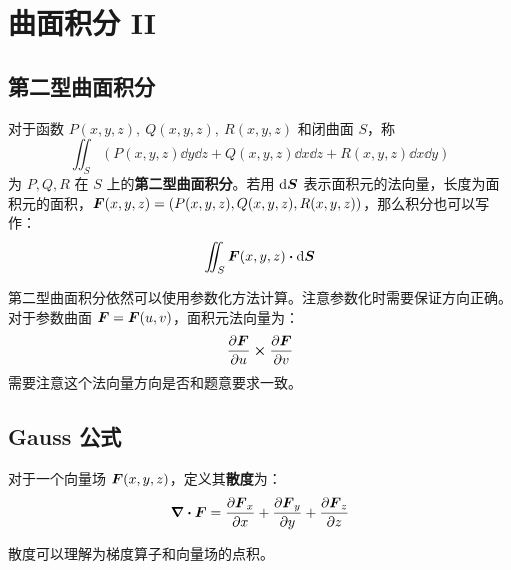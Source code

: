 \section{曲面积分 II}

\subsection{第二型曲面积分}

\begin{definition}[第二型曲面积分]
	对于函数 $P(x, y, z),\ Q(x, y, z),\ R(x, y, z)$ 和闭曲面 $S$，称
	$$
	\iint_S (P(x, y, z) \dd{y} \dd{z} + Q(x, y, z) \dd{x} \dd{z} + R(x, y, z) \dd{x} \dd{y})
	$$
	为 $P, Q, R$ 在 $S$ 上的\textbf{第二型曲面积分}。若用 $\dd{\boldsymbol{S}}$ 表示面积元的法向量，长度为面积元的面积，$\boldsymbol{F}(x, y, z) = (P(x, y, z), Q(x, y, z), R(x, y, z))$，那么积分也可以写作：
	$$
	\iint_S \vect{F}(x, y, z) \vdot \dd{\vect{S}}
	$$
\end{definition}

第二型曲面积分依然可以使用参数化方法计算。注意参数化时需要保证方向正确。对于参数曲面 $\boldsymbol{F} = \boldsymbol{F}(u, v)$，面积元法向量为：
$$
\pdv{\vect{F}}{u} \cp \pdv{\vect{F}}{v}
$$
需要注意这个法向量方向是否和题意要求一致。

\subsection{Gauss 公式}

\begin{definition}[散度]
	对于一个向量场 $\boldsymbol{F}(x, y, z)$，定义其\textbf{散度}为：
	$$
	\div \boldsymbol{F} = \pdv{\boldsymbol{F}_x}{x} + \pdv{\boldsymbol{F}_y}{y} + \pdv{\boldsymbol{F}_z}{z}
	$$
\end{definition}

散度可以理解为梯度算子和向量场的点积。

